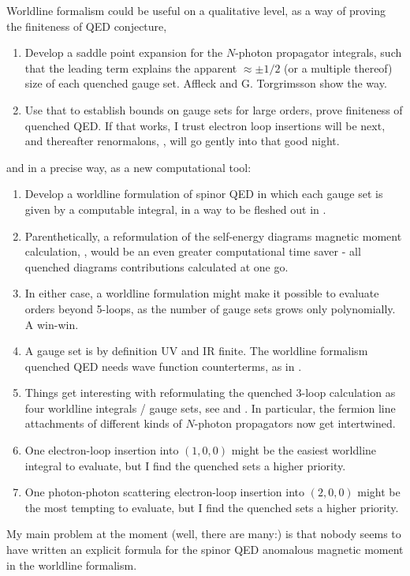 Worldline formalism could be useful on a qualitative level, as a way of
proving the finiteness of QED conjecture,
    \begin{enumerate}
  \item
Develop a saddle point expansion for the $N$-photon propagator
integrals, such that the
leading term explains the apparent $\approx \pm 1/2$ (or a multiple
thereof) size of each quenched gauge set. Affleck \etal{}
and G. Torgrimsson \etal{} show the way.
  \item
Use that to establish bounds on gauge sets for large orders, prove
finiteness of quenched QED. If that works, I trust electron loop
insertions will be next, and thereafter renormalons, \etc,
will go 
{gently into that good night}.
    \end{enumerate}
and in a precise way, as a new computational tool:
    \begin{enumerate}
  \item
Develop a worldline formulation of spinor QED in which each gauge set is
given by a computable integral, in a way to be fleshed out in
.
  \item
Parenthetically, a reformulation of the self-energy diagrams magnetic
moment calculation, , would be an even greater
computational time saver - all quenched diagrams contributions calculated
at one go.
  \item
In either case, a
worldline formulation might make it possible to evaluate orders beyond
5-loops, as the number of gauge sets grows only polynomially. A win-win.
  \item
A gauge set is by definition UV and IR finite. The worldline formalism
quenched QED needs wave function
counterterms, as in .
  \item
Things get interesting with reformulating the quenched 3-loop calculation
as four worldline integrals / gauge sets, see  and
. In particular, the fermion line attachments of
different kinds of $N$-photon propagators now get intertwined.
  \item
One electron-loop insertion into $(1,0,0)$  might be the easiest
worldline integral to
evaluate, but I find the quenched sets a higher priority.
  \item
One photon-photon scattering electron-loop insertion into $(2,0,0)$ might
be the most tempting to evaluate, but I find the quenched sets a higher
priority.
    \end{enumerate}
My main problem at the moment (well, there are many:) is that nobody
seems to have written an explicit formula for the spinor QED anomalous
magnetic moment in the worldline formalism.
